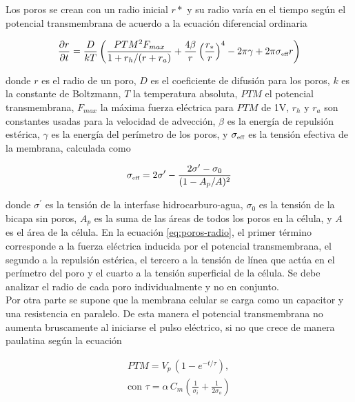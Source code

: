 Los poros se crean con un radio inicial $r*$ y su radio varía en el tiempo según el potencial transmembrana de acuerdo a la ecuación diferencial ordinaria \cite{krass07}

\begin{equation} \label{eq:poros-radio}
	\frac{\partial r}{\partial t} = \frac{D}{kT} \left( \frac{PTM^2 F_{max}}{1+r_h / (r+r_a)} + \frac{4 \beta}{r} \left(\frac{r_*}{r}\right)^4 - 2 \pi \gamma + 2 \pi \sigma_{\textrm{\tiny eff}} r\right)
\end{equation}

donde $r$ es el radio de un poro, $D$ es el coeficiente de difusión para los poros, $k$ es la constante de Boltzmann, $T$ la temperatura absoluta, $PTM$ el potencial transmembrana, $F_{max}$ la máxima fuerza eléctrica para $PTM$ de 1V, $r_h$ y $r_a$ son constantes usadas para la velocidad de advección, $\beta$ es la energía de repulsión estérica, $\gamma$ es la energía del perímetro de los poros, y $\sigma_{\textrm{\tiny eff}}$ es la tensión efectiva de la membrana, calculada como

\begin{equation}
	\sigma_{\textrm{\tiny eff}} = 2 \sigma^\prime - \frac{2 \sigma^\prime - \sigma_0}{(1 - A_p / A)^2}
\end{equation}

donde $\sigma^\prime$ es la tensión de la interfase hidrocarburo-agua, $\sigma_0$ es la tensión de la bicapa sin poros, $A_p$ es la suma de las áreas de todos los poros en la célula, y $A$ es el área de la célula. En la ecuación \ref{eq:poros-radio}, el primer término corresponde a la fuerza eléctrica inducida por el potencial transmembrana, el segundo a la repulsión estérica, el tercero a la tensión de línea que actúa en el perímetro del poro y el cuarto a la tensión superficial de la célula. Se debe analizar el radio de cada poro individualmente y no en conjunto.\\

Por otra parte se supone que la membrana celular se carga como un capacitor y una resistencia en paralelo. De esta manera el potencial transmembrana no aumenta bruscamente al iniciarse el pulso eléctrico, si no que crece de manera paulatina según la ecuación \cite{hibino}

\begin{equation} \label{eq:capacit} \begin{split}
	PTM = V_p\, (1 - e^{-t/\tau}) , \\ \textrm{con } \tau = \alpha\, C_m \left( \frac{1}{\sigma_i} + \frac{1}{2 \sigma_o} \right)
\end{split} \end{equation}

